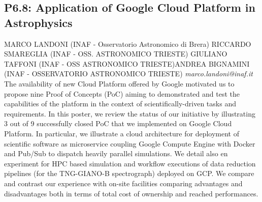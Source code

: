 \documentclass{report}
\begin{document}
\subsection*{P6.8: Application of Google Cloud Platform in Astrophysics}
\bigskip
MARCO LANDONI (INAF - Osservatorio Astronomico di Brera) \newline RICCARDO SMAREGLIA (INAF - OSS. ASTRONOMICO TRIESTE) \newline  GIULIANO TAFFONI (INAF - OSS ASTRONOMICO TRIESTE)\newline  ANDREA BIGNAMINI (INAF - OSSERVATORIO ASTRONOMICO TRIESTE)\newline  \newline  \newline\newline
{\it marco.landoni@inaf.it}\newline
\newline\newline
The availability of new Cloud Platform offered by Google motivated us to propose nine Proof of Concepts (PoC) aiming to demonstrated and test the capabilities of the platform in the context of scientifically-driven tasks and requirements.
In this poster, we review the status of our initiative by illustrating 3 out of 9 successfully closed PoC that we implemented on Google Cloud Platform.
In particular, we illustrate a cloud architecture for deployment of scientific software as microservice coupling Google Compute Engine with Docker and Pub/Sub to dispatch heavily parallel simulations. We detail also en experiment for HPC based simulation and workflow executions of data reduction pipelines (for the TNG-GIANO-B spectrograph) deployed on GCP. We compare and contrast our experience with on-site facilities comparing advantages and disadvantages both in terms of total cost of ownership and reached performances.\newline
\newpage
\end{document}
